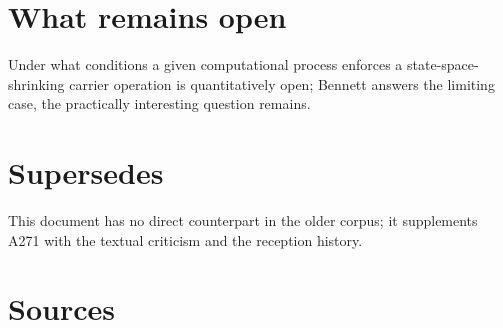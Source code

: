 \section{What remains open}

Under what conditions a given computational process enforces a
state-space-shrinking carrier operation is quantitatively open; Bennett answers the
limiting case, the practically interesting question remains.

\section{Supersedes}

This document has no direct counterpart in the older corpus; it supplements A271
with the textual criticism and the reception history.

\clearpage
{}
{}
\section*{Sources}

